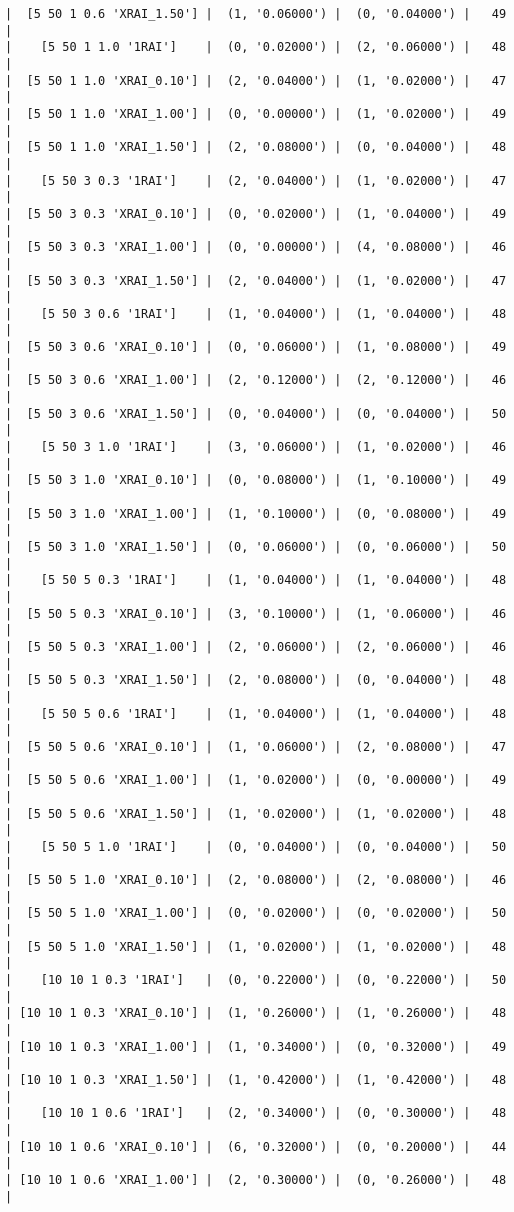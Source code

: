 \documentclass{article}
\begin{document}
\begin{verbatim}
|  [5 50 1 0.6 'XRAI_1.50'] |  (1, '0.06000') |  (0, '0.04000') |   49  |
|    [5 50 1 1.0 '1RAI']    |  (0, '0.02000') |  (2, '0.06000') |   48  |
|  [5 50 1 1.0 'XRAI_0.10'] |  (2, '0.04000') |  (1, '0.02000') |   47  |
|  [5 50 1 1.0 'XRAI_1.00'] |  (0, '0.00000') |  (1, '0.02000') |   49  |
|  [5 50 1 1.0 'XRAI_1.50'] |  (2, '0.08000') |  (0, '0.04000') |   48  |
|    [5 50 3 0.3 '1RAI']    |  (2, '0.04000') |  (1, '0.02000') |   47  |
|  [5 50 3 0.3 'XRAI_0.10'] |  (0, '0.02000') |  (1, '0.04000') |   49  |
|  [5 50 3 0.3 'XRAI_1.00'] |  (0, '0.00000') |  (4, '0.08000') |   46  |
|  [5 50 3 0.3 'XRAI_1.50'] |  (2, '0.04000') |  (1, '0.02000') |   47  |
|    [5 50 3 0.6 '1RAI']    |  (1, '0.04000') |  (1, '0.04000') |   48  |
|  [5 50 3 0.6 'XRAI_0.10'] |  (0, '0.06000') |  (1, '0.08000') |   49  |
|  [5 50 3 0.6 'XRAI_1.00'] |  (2, '0.12000') |  (2, '0.12000') |   46  |
|  [5 50 3 0.6 'XRAI_1.50'] |  (0, '0.04000') |  (0, '0.04000') |   50  |
|    [5 50 3 1.0 '1RAI']    |  (3, '0.06000') |  (1, '0.02000') |   46  |
|  [5 50 3 1.0 'XRAI_0.10'] |  (0, '0.08000') |  (1, '0.10000') |   49  |
|  [5 50 3 1.0 'XRAI_1.00'] |  (1, '0.10000') |  (0, '0.08000') |   49  |
|  [5 50 3 1.0 'XRAI_1.50'] |  (0, '0.06000') |  (0, '0.06000') |   50  |
|    [5 50 5 0.3 '1RAI']    |  (1, '0.04000') |  (1, '0.04000') |   48  |
|  [5 50 5 0.3 'XRAI_0.10'] |  (3, '0.10000') |  (1, '0.06000') |   46  |
|  [5 50 5 0.3 'XRAI_1.00'] |  (2, '0.06000') |  (2, '0.06000') |   46  |
|  [5 50 5 0.3 'XRAI_1.50'] |  (2, '0.08000') |  (0, '0.04000') |   48  |
|    [5 50 5 0.6 '1RAI']    |  (1, '0.04000') |  (1, '0.04000') |   48  |
|  [5 50 5 0.6 'XRAI_0.10'] |  (1, '0.06000') |  (2, '0.08000') |   47  |
|  [5 50 5 0.6 'XRAI_1.00'] |  (1, '0.02000') |  (0, '0.00000') |   49  |
|  [5 50 5 0.6 'XRAI_1.50'] |  (1, '0.02000') |  (1, '0.02000') |   48  |
|    [5 50 5 1.0 '1RAI']    |  (0, '0.04000') |  (0, '0.04000') |   50  |
|  [5 50 5 1.0 'XRAI_0.10'] |  (2, '0.08000') |  (2, '0.08000') |   46  |
|  [5 50 5 1.0 'XRAI_1.00'] |  (0, '0.02000') |  (0, '0.02000') |   50  |
|  [5 50 5 1.0 'XRAI_1.50'] |  (1, '0.02000') |  (1, '0.02000') |   48  |
|    [10 10 1 0.3 '1RAI']   |  (0, '0.22000') |  (0, '0.22000') |   50  |
| [10 10 1 0.3 'XRAI_0.10'] |  (1, '0.26000') |  (1, '0.26000') |   48  |
| [10 10 1 0.3 'XRAI_1.00'] |  (1, '0.34000') |  (0, '0.32000') |   49  |
| [10 10 1 0.3 'XRAI_1.50'] |  (1, '0.42000') |  (1, '0.42000') |   48  |
|    [10 10 1 0.6 '1RAI']   |  (2, '0.34000') |  (0, '0.30000') |   48  |
| [10 10 1 0.6 'XRAI_0.10'] |  (6, '0.32000') |  (0, '0.20000') |   44  |
| [10 10 1 0.6 'XRAI_1.00'] |  (2, '0.30000') |  (0, '0.26000') |   48  |

\end{verbatim}
\end{document}
